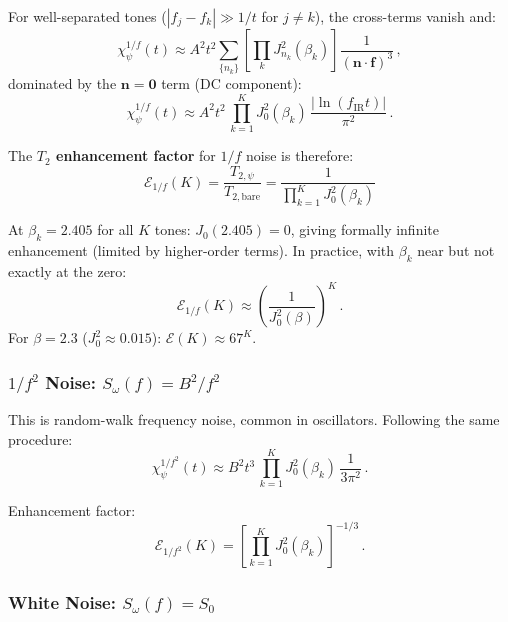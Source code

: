 \documentclass[aps,prl,twocolumn,superscriptaddress,nofootinbib,longbibliography]{revtex4-2}
\begin{document}
For well-separated tones ($|f_j - f_k| \gg 1/t$ for $j \neq k$), the
cross-terms vanish and:
\begin{equation}\label{eq:chi-1f-approx}
\chi_\psi^{1/f}(t) \approx A^2 t^2 \sum_{\{n_k\}}
\left[\prod_k J_{n_k}^2(\beta_k)\right]
\frac{1}{(\bm{n}\cdot\bm{f})^3}\,,
\end{equation}
dominated by the $\bm{n} = \bm{0}$ term (DC component):
\begin{equation}
\chi_\psi^{1/f}(t) \approx A^2 t^2\,\prod_{k=1}^K J_0^2(\beta_k)\,
\frac{|\ln(f_{\text{IR}}t)|}{\pi^2}\,.
\end{equation}

The \textbf{$T_2$ enhancement factor} for $1/f$ noise is therefore:
\begin{equation}\label{eq:enhance-1f}
\boxed{
\mathcal{E}_{1/f}(K) = \frac{T_{2,\psi}}{T_{2,\text{bare}}}
= \frac{1}{\prod_{k=1}^K J_0^2(\beta_k)}
}
\end{equation}

At $\beta_k = 2.405$ for all $K$ tones: $J_0(2.405) = 0$, giving
formally infinite enhancement (limited by higher-order terms). In
practice, with $\beta_k$ near but not exactly at the zero:
\begin{equation}
\mathcal{E}_{1/f}(K) \approx \left(\frac{1}{J_0^2(\beta)}\right)^K\,.
\end{equation}
For $\beta = 2.3$ ($J_0^2 \approx 0.015$): $\mathcal{E}(K) \approx 67^K$.

\subsubsection{$1/f^2$ Noise: $S_\omega(f) = B^2/f^2$}

This is random-walk frequency noise, common in oscillators. Following
the same procedure:
\begin{equation}\label{eq:chi-1f2}
\chi_\psi^{1/f^2}(t) \approx B^2 t^3\,\prod_{k=1}^K J_0^2(\beta_k)\,
\frac{1}{3\pi^2}\,.
\end{equation}

Enhancement factor:
\begin{equation}\label{eq:enhance-1f2}
\mathcal{E}_{1/f^2}(K) = \left[\prod_{k=1}^K J_0^2(\beta_k)\right]^{-1/3}\,.
\end{equation}

\subsubsection{White Noise: $S_\omega(f) = S_0$}
\end{document}

